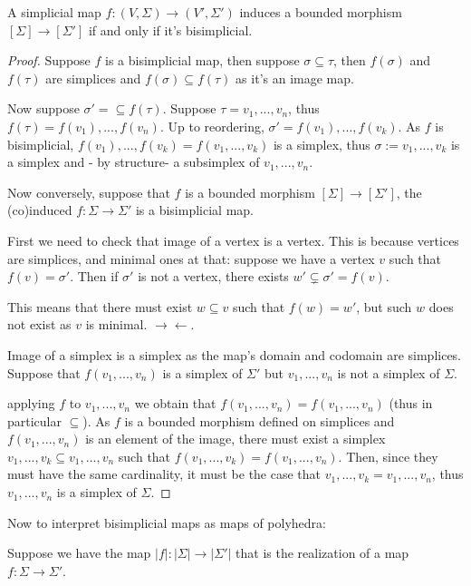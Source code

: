 \begin{lemma}\hfill 
    
    A simplicial map $f:(V,\Sigma)\to(V',\Sigma')$ induces a bounded morphism $[\Sigma]\to[\Sigma']$ if and only if it's bisimplicial.
\end{lemma}
\begin{proof}
    Suppose $f$ is a bisimplicial map, then suppose 
    $\sigma\subseteq \tau$, then $f(\sigma)$ and $f(\tau)$ are simplices and $f(\sigma)\subseteq f(\tau)$ as it's an image map.

    Now suppose $\sigma'=\subseteq f(\tau)$. Suppose $\tau=v_1,...,v_n$, thus $f(\tau)=f(v_1),...,f(v_n)$. Up to reordering, $\sigma'=f(v_1),...,f(v_k)$.
    As $f$ is bisimplicial, $f(v_1),...,f(v_k)=f(v_1,...,v_k)$ is a simplex, thus $\sigma:=v_1,...,v_k$ is a simplex and - by structure- a subsimplex of $v_1,...,v_n$. 
    
    Now conversely, suppose that $f$ is a bounded morphism $[\Sigma]\to[\Sigma']$, the (co)induced $f:\Sigma\to\Sigma'$ is a bisimplicial map.

    First we need to check that image of a vertex is a vertex. This is because vertices are simplices, and minimal ones at that:
    suppose we have a vertex $v$ such that $f(v)=\sigma'$. Then if $\sigma'$ is not a vertex, there exists $w'\subsetneq \sigma'=f(v)$.

    This means that there must exist $w\subseteq v$ such that $f(w)=w'$, but such $w$ does not exist as $v$ is minimal. $\to\gets$.

    Image of a simplex is a simplex as the map's domain and codomain are simplices. Suppose that  
    $f(v_1,...,v_n)$ is a simplex of $\Sigma'$ but $v_1,...,v_n$ is not a simplex of $\Sigma$. 
    
    applying $f$ to $v_1,...,v_n$ we obtain that $f(v_1,...,v_n)=f(v_1,...,v_n)$ (thus in particular $\subseteq$).
    As $f$ is a bounded morphism defined on simplices and $f(v_1,...,v_n)$ is an element of the image,
    there must exist a simplex $v_1,...,v_k\subseteq v_1,...,v_n$ such that $f(v_1,...,v_k)=f(v_1,...,v_n)$. 
    Then, since they must have the same cardinality, it must be the case that
    $v_1,...,v_k=v_1,...,v_n$, thus $v_1,...,v_n$ is a simplex of $\Sigma$.
\end{proof}

Now to interpret bisimplicial maps as maps of polyhedra: 

Suppose we have the map $|f|:|\Sigma|\to|\Sigma'|$ that is the realization of a map $f:\Sigma\to\Sigma'$. 

